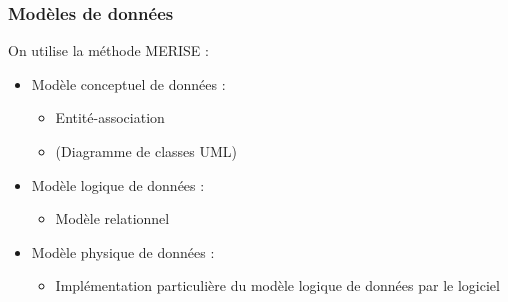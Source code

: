 
\begin{frame}
  \frametitle{Modèles de données}
    On utilise la méthode MERISE :
  \begin{itemize}
    \item Modèle conceptuel de données :
      \begin{itemize}
        \item Entité-association
        \item (Diagramme de classes UML)
      \end{itemize}
    \item Modèle logique de données :
      \begin{itemize}
        \item Modèle relationnel
      \end{itemize}
    \item Modèle physique de données :
      \begin{itemize}
        \item Implémentation particulière du modèle logique de données par le logiciel
      \end{itemize}
  \end{itemize}
\end{frame}

